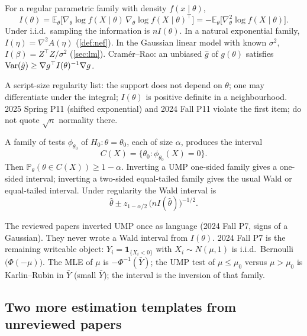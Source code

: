\begin{definition}
\label{def:fisher}
For a regular parametric family with density \(f(x\mid\theta)\),
\[
I(\theta)
=
\mathbb{E}_{\theta}\bigl[\nabla_{\theta}\log f(X\mid\theta)\,
\nabla_{\theta}\log f(X\mid\theta)^{\top}\bigr]
=
-\mathbb{E}_{\theta}\bigl[\nabla^{2}_{\theta}\log f(X\mid\theta)\bigr].
\]
Under i.i.d.\ sampling the information is \(nI(\theta)\). In a natural exponential family, \(I(\eta)=\nabla^{2}A(\eta)\) (\cref{def:nef}). In the Gaussian linear model with known \(\sigma^{2}\), \(I(\beta)=Z^{\top}Z/\sigma^{2}\) (\cref{sec:lm}). Cram\'er--Rao: an unbiased \(\hat g\) of \(g(\theta)\) satisfies \(\operatorname{Var}(\hat g)\ge \nabla g^{\top}I(\theta)^{-1}\nabla g\).
\end{definition}

A script-size regularity list: the support does not depend on \(\theta\); one may differentiate under the integral; \(I(\theta)\) is positive definite in a neighbourhood. 2025 Spring P11 (shifted exponential) and 2024 Fall P11 violate the first item; do not quote \(\sqrt{n}\) normality there.

\begin{definition}
\label{def:ci}
A family of tests \(\phi_{\theta_{0}}\) of \(H_{0}:\theta=\theta_{0}\), each of size \(\alpha\), produces the interval
\[
C(X)
=
\bigl\{\theta_{0}:\phi_{\theta_{0}}(X)=0\bigr\}.
\]
Then \(\mathbb{P}_{\theta}(\theta\in C(X))\ge 1-\alpha\). Inverting a UMP one-sided family gives a one-sided interval; inverting a two-sided equal-tailed family gives the usual Wald or equal-tailed interval. Under regularity the Wald interval is
\[
\hat\theta
\pm
z_{1-\alpha/2}\,
\bigl(nI(\hat\theta)\bigr)^{-1/2}.
\]
\end{definition}

The reviewed papers inverted UMP once as language (2024 Fall P7, signs of a Gaussian). They never wrote a Wald interval from \(I(\theta)\). 2024 Fall P7 is the remaining writeable object: \(Y_{i}=\mathbf{1}_{\{X_{i}<0\}}\) with \(X_{i}\sim N(\mu,1)\) is i.i.d.\ Bernoulli\(\bigl(\Phi(-\mu)\bigr)\). The MLE of \(\mu\) is \(-\Phi^{-1}(\bar Y)\); the UMP test of \(\mu\le\mu_{0}\) versus \(\mu>\mu_{0}\) is Karlin--Rubin in \(\bar Y\) (small \(\bar Y\)); the interval is the inversion of that family.

\subsection{Two more estimation templates from unreviewed papers}

